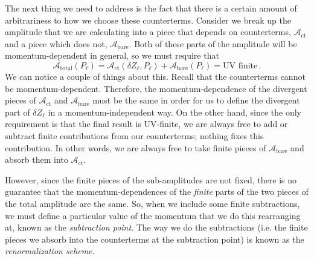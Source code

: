 \documentclass{article}
\numberwithin{equation}{subsection}
\begin{document}
The next thing we need to address is the fact that there is a certain amount of arbitrariness to how we choose these counterterms. Consider we break up the amplitude that 
we are calculating into a piece that depends on counterterms, $\mathcal{A}_{\text{ct}}$ and a piece which does not, $\mathcal{A}_{\text{bare}}$. Both of these parts of the amplitude 
will be momentum-dependent in general, so we must require that
\begin{equation}
    \mathcal{A}_{\text{total}}(P_\ell) = \mathcal{A}_{\text{ct}}(\delta Z_\ell, P_\ell) + \mathcal{A}_{\text{bare}}(P_\ell) = \text{UV finite}\,.
\end{equation}
We can notice a couple of things about this. Recall that the counterterms cannot be momentum-dependent. Therefore, the momentum-dependence of the divergent pieces of 
$\mathcal{A}_{\text{ct}}$ and $\mathcal{A}_{\text{bare}}$ must be the same in order for us to define the divergent part of $\delta Z_\ell$ in a momentum-independent way. On the other 
hand, since the only requirement is that the final result is UV-finite, we are always free to add or subtract finite contributions from our counterterms; nothing fixes this contribution. 
In other words, we are always free to take finite pieces of $\mathcal{A}_{\text{bare}}$ and absorb them into $\mathcal{A}_{\text{ct}}$.

However, since the finite pieces of the sub-amplitudes are not fixed, there is no guarantee that the momentum-dependences of the \textit{finite} parts of the two pieces of the total amplitude 
are the same. So, when we include some finite subtractions, we must define a particular value of the momentum that we do this rearranging at, known as the \textit{subtraction point}. 
The way we do the subtractions (i.e. the finite pieces we absorb into the counterterms at the subtraction point) is known as the \textit{renormalization scheme}.
\end{document}
